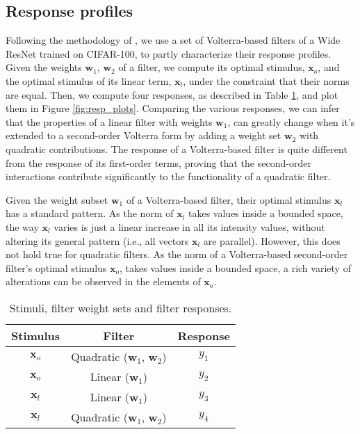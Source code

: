 \documentclass[10pt,twocolumn,letterpaper]{article}
\renewcommand{\vec}[1]{\mathbf{#1}}
\begin{document}

\subsection{Response profiles}

   Following the methodology of \cite{Analysis06}, we use a set of Volterra-based filters of a Wide ResNet trained on CIFAR-100, to partly characterize their response profiles. Given the weights $\vec{w}_{1}$, $\vec{w}_{2}$ of a filter, we compute its optimal stimulus, $\vec{x}_{o}$, and the optimal stimulus of its linear term, $\vec{x}_{l}$, under the constraint that their norms are equal. Then, we compute four responses, as described in Table \ref{tab:resp_prof}, and plot them in Figure \ref{fig:resp_plots}. Comparing the various responses, we can infer that the properties of a linear filter with weights $\vec{w}_{1}$, can greatly change when it's extended to a second-order Volterra form by adding a weight set $\vec{w}_{2}$ with quadratic contributions. The response of a Volterra-based filter is quite different from the response of its first-order terms, proving that the second-order interactions contribute significantly to the functionality of a quadratic filter.
   
   Given the weight subset $\vec{w}_{1}$ of a Volterra-based filter, their optimal stimulus $\vec{x}_{l}$ has a standard pattern. As the norm of $\vec{x}_{l}$ takes values inside a bounded space, the way $\vec{x}_{l}$ varies is just a linear increase in all its intensity values, without altering its general pattern (i.e., all vectors $\vec{x}_{l}$ are parallel). However, this does not hold true for quadratic filters. As the norm of a Volterra-based second-order filter's optimal stimulus $\vec{x}_{o}$, takes values inside a bounded space, a rich variety of alterations can be observed in the elements of $\vec{x}_{o}$.
   

\begin{table}[!ht]
\centering
\setlength{\tabcolsep}{.3em}
\begin{tabular}{|c|c|c|}
\hline
\textbf{Stimulus} & \textbf{Filter} & \textbf{Response} \\
\hline
$\vec{x}_o$ & Quadratic ($\vec{w}_1$, $\vec{w}_2$)  & $y_{1}$ \\ \hline
$\vec{x}_o$ & Linear    ($\vec{w}_1$) 			   & $y_{2}$ \\ \hline
$\vec{x}_l$ & Linear    ($\vec{w}_1$) 			   & $y_{3}$ \\ \hline
$\vec{x}_l$ & Quadratic ($\vec{w}_1$, $\vec{w}_2$)  & $y_{4}$ \\ \hline
\end{tabular}
\caption{Stimuli, filter weight sets and filter responses.}
\label{tab:resp_prof}
\end{table} 
\end{document}
